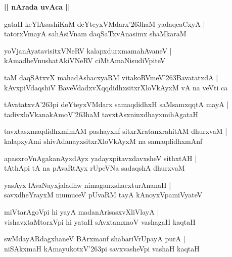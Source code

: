 \documentclass[twoside,12pt,openright]{book}
\def\S{\char'263}
\newcounter{shloka}[chapter]
\def\uvaca#1{\centerline{{\large\textbf{#1}}}}
\begin{document}
\uvaca{|| nArada uvAca ||}

\begin{shloka}%
gataH keYlAsashiKaM deYteyxVMdarx\S haM yadaqcaCxyA |\\
tatorxVmayA sahAsiVnam daqSaTxvAnasimx shaMkaraM 
\end{shloka}

\begin{shloka}%
yoVjanAyatavisitxVNeRV kalapxdurxmamahAvaneV |\\
kAmadheVnushatAkiVNeRV ciMtAmaNisudiVpiteV 
\end{shloka}

\begin{shloka}%
taM daqSAtxvX mahadAshacxyaRM vitakoRVmeV\S BavatatxdA |\\
kAvxpiVdaqshiV BaveVdadxvXqqdidhxsitxrXloVkAyxM vA na veVti ca
\end{shloka}

\begin{shloka}%
tAvatatxvA\S pi deYteyxVMdarx samaqdidhxH saMsamxqqtA mayA |\\
tadivxloVkanakAmoV\S haM tavxtAsxninxdhayxmihAgataH 
\end{shloka}

\begin{shloka}%
tavxtasxmaqdidhxmimAM pashayxnf sitxrXratanxrahitAM dhurxvaM |\\
kalapxyAmi shivAdanayxsitxrXloVkAyxM na samaqdidhxmAnf 
\end{shloka}

\begin{shloka}%
apasxroVnAgakanAyxdAyx yadayxpitavxdavxsheV sithxtAH |\\
tAthApi tA na  pAvaRtAyx rUpeVNa sadaqshA dhurxvaM 
\end{shloka}

\begin{shloka}%
yasAyx lAvaNayxjaladhw nimaganxshacxturAnanaH |\\
savxdheYrayxM mumuceV pUvaRM tayA kAnoyxVpamiVyateV 
\end{shloka}

\begin{shloka}%
miVtarAgoVpi hi yayA madanArisasxvXliVlayA |\\
vishavxtaMtorxVpi hi yataH sAvxtamxnoV vashagaH kaqtaH 
\end{shloka}

\begin{shloka}%
swMdayARdagxhaneV BArxmanf shabariVrUpayA purA |\\
niSAkxmaH kAmayukotxV\S pi savxvasheVpi vashaH kaqtaH 
\end{shloka}
\end{document}

